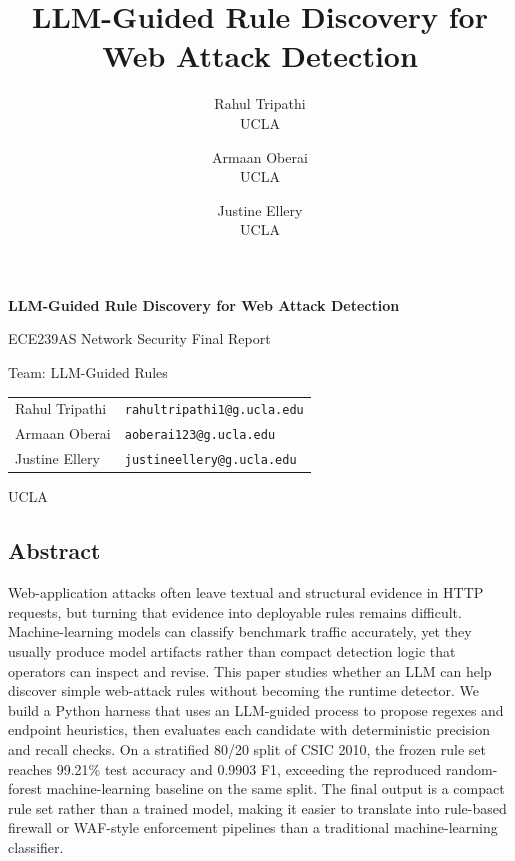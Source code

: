 \documentclass[letterpaper,twocolumn,10pt]{article}
\begin{document}
\date{}

\title{\Large \bf LLM-Guided Rule Discovery for Web Attack Detection}

\author{
{\rm Rahul Tripathi}\\
UCLA
\and
{\rm Armaan Oberai}\\
UCLA
\and
{\rm Justine Ellery}\\
UCLA
}

\begin{titlepage}
\centering
\vspace*{1.25in}
{\Large \bf LLM-Guided Rule Discovery for Web Attack Detection\par}
\vspace{0.35in}
{\large ECE239AS Network Security Final Report\par}
\vspace{0.25in}
{\large Team: LLM-Guided Rules\par}
\vspace{0.5in}
\begin{tabular}{ll}
Rahul Tripathi & \texttt{rahultripathi1@g.ucla.edu} \\
Armaan Oberai & \texttt{aoberai123@g.ucla.edu} \\
Justine Ellery & \texttt{justineellery@g.ucla.edu} \\
\end{tabular}
\vfill
{\large UCLA\par}
\end{titlepage}
\clearpage
{}

\maketitle

\thispagestyle{empty}


\subsection*{Abstract}

Web-application attacks often leave textual and structural evidence in HTTP requests, but turning that evidence into deployable rules remains difficult. Machine-learning models can classify benchmark traffic accurately, yet they usually produce model artifacts rather than compact detection logic that operators can inspect and revise. This paper studies whether an LLM can help discover simple web-attack rules without becoming the runtime detector. We build a Python harness that uses an LLM-guided process to propose regexes and endpoint heuristics, then evaluates each candidate with deterministic precision and recall checks. On a stratified 80/20 split of CSIC 2010, the frozen rule set reaches 99.21\% test accuracy and 0.9903 F1, exceeding the reproduced random-forest machine-learning baseline on the same split. The final output is a compact rule set rather than a trained model, making it easier to translate into rule-based firewall or WAF-style enforcement pipelines than a traditional machine-learning classifier.
\end{document}
